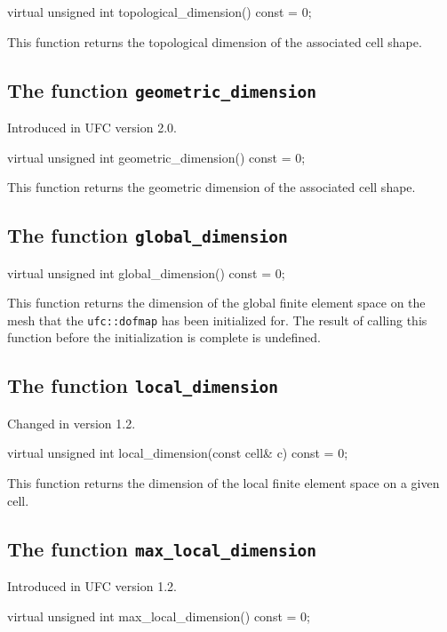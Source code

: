 \begin{code}
virtual unsigned int topological_dimension() const = 0;
\end{code}

This function returns the topological dimension of the associated cell
shape.

\subsection{The function \texttt{geometric\_dimension}}
Introduced in UFC version 2.0.

\begin{code}
virtual unsigned int geometric_dimension() const = 0;
\end{code}

This function returns the geometric dimension of the associated cell
shape.

\subsection{The function \texttt{global\_dimension}}

\begin{code}
virtual unsigned int global_dimension() const = 0;
\end{code}

This function returns the dimension of the global finite element space
on the mesh that the \texttt{ufc::dofmap} has been initialized
for. The result of calling this function before the initialization is
complete is undefined.

\subsection{The function \texttt{local\_dimension}}
Changed in version 1.2.

\begin{code}
virtual unsigned int local_dimension(const cell& c) const = 0;
\end{code}

This function returns the dimension of the local finite element space
on a given cell.

\subsection{The function \texttt{max\_local\_dimension}}
Introduced in UFC version 1.2.

\begin{code}
virtual unsigned int max_local_dimension() const = 0;
\end{code}

